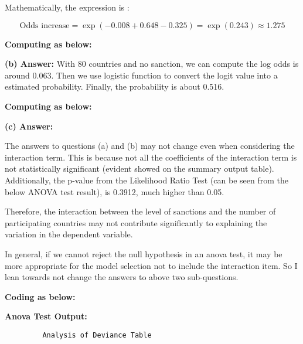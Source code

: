 \documentclass[12pt,letterpaper]{article}
\begin{document}
\begin{enumerate}
\begin{enumerate}
		Mathematically, the expression is : 
		
		\noindent  \[ \text{Odds increase} = \exp(-0.008 + 0.648 - 0.325) = \exp(0.243) \approx 1.275 \]
		
		\noindent
		\textbf{Computing as below:}
		
		
		
		\vspace{.15cm}
		
		\noindent \textbf{(b) Answer:}
		With 80 countries and no sanction, we can compute the log odds is around 0.063. Then we use logistic function to convert the logit value into a estimated probability. Finally, the probability is about 0.516.
		
		\noindent
		\textbf{Computing as below:}
		
		
		
		\vspace{.15cm}
		
		
		\noindent \textbf{(c) Answer:}
		
				\noindent The answers to questions (a) and (b) may not  change even when considering the interaction term. This is because not all the coefficients of the interaction term is not statistically significant (evident showed on the summary output table). Additionally, the p-value from the Likelihood Ratio Test (can be seen from the below ANOVA test result), is 0.3912, much higher than 0.05. 
				
				Therefore, the interaction between the level of sanctions and the number of participating countries may not contribute significantly to explaining the variation in the dependent variable.
				
				In general, if we cannot reject the null hypothesis in an anova test, it may be more appropriate for the model selection not to include the interaction item. So I lean towards not change the answers to above two sub-questions.
		
			\vspace{.15cm}
				
		\textbf{Coding as below:}
		
		
		
		
		\noindent \textbf{Anova Test Output:}
		

		
		 \begin{verbatim}
		 Analysis of Deviance Table
		 

\end{verbatim}
\end{enumerate}
\end{enumerate}
\end{document}
